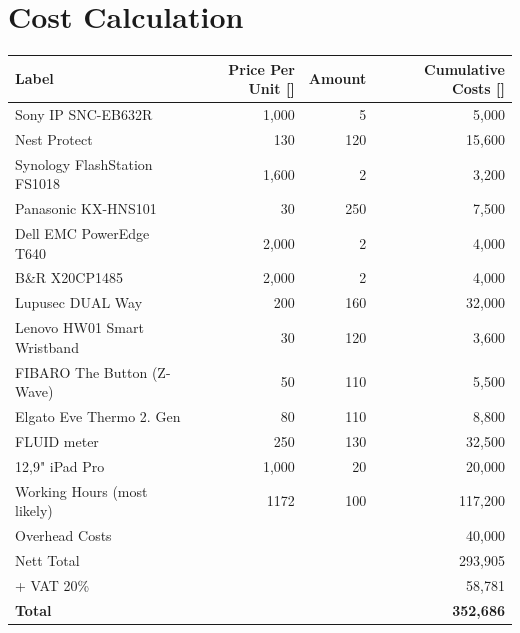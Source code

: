 \section{Cost Calculation}
\begin{table}[h]
	\centering
	\renewcommand{\arraystretch}{1.9}
	\begin{tabular}{lrrr}
	Label & Price Per Unit [\officialeuro] & Amount & Cumulative Costs [\officialeuro] \\
	\hline
	Sony IP SNC-EB632R & 1,000 & 5 & 5,000\\
	Nest Protect & 130 & 120 & 15,600\\
	Synology FlashStation FS1018 & 1,600 & 2 & 3,200\\
	Panasonic KX-HNS101 & 30 & 250 & 7,500\\
	Dell EMC PowerEdge T640 & 2,000 & 2 & 4,000\\
	B\&R X20CP1485 & 2,000 & 2 & 4,000\\
	Lupusec DUAL Way & 200 & 160 & 32,000\\
	Lenovo HW01 Smart Wristband & 30 & 120 & 3,600\\
	FIBARO The Button (Z-Wave) & 50 & 110 & 5,500\\
	Elgato Eve Thermo 2. Gen & 80 & 110 & 8,800\\
	FLUID meter & 250 & 130 & 32,500\\
	12,9" iPad Pro & 1,000 & 20 & 20,000\\
	\hline
	Working Hours (most likely)& 1172 & 100 & 117,200 \\
	Overhead Costs &  &  & 40,000\\
	\hline
	\hline
	Nett Total & & & 293,905\\
	+ VAT 20\% & & & 58,781\\
	\hline
	\hline
	\textbf{Total} & & & \textbf{352,686}
	\end{tabular}
\end{table}
